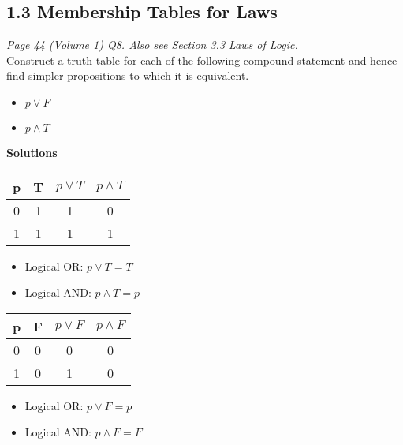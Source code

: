 
\subsection*{1.3 Membership Tables for Laws}
\emph{Page 44 (Volume 1) Q8.
Also see Section 3.3 Laws of Logic.}\\

Construct a truth table for each of the following compound statement and hence find simpler propositions to which it is equivalent.


\begin{itemize}
\item $p \vee F$
\item $p \wedge T$
\end{itemize}
\textbf{Solutions}
\begin{center}
{
\begin{tabular}{|c|c||c|c|}
\hline  p & T & $p \vee T$ & $ p \wedge T$ \\ \hline
\hline  0 & 1 & 1 & 0 \\ 
\hline  1 &  1 & 1 & 1 \\ 
\hline 
\end{tabular} 
}
\end{center}
\begin{itemize}
\item Logical OR: $p \vee T = T $
\item Logical AND: $p \wedge T = p  $
\end{itemize}

\begin{center}
{
\begin{tabular}{|c|c||c|c|}
\hline  p & F & $p \vee F$ & $ p \wedge F$ \\ \hline
\hline  0 & 0 & 0 & 0 \\ 
\hline  1 &  0 & 1 & 0 \\ 
\hline 
\end{tabular} 
}
\end{center}
\begin{itemize}
\item Logical OR:  $p \vee F = p $
\item Logical AND: $p \wedge F = F $
\end{itemize}
